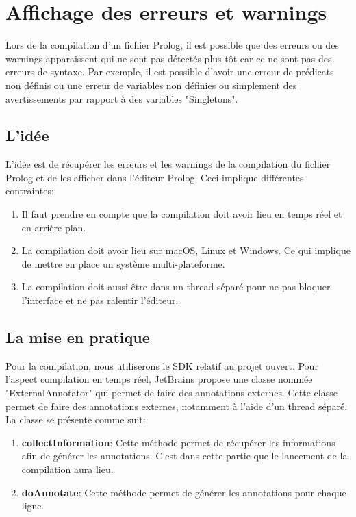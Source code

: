 \section{Affichage des erreurs et warnings}
\noindent Lors de la compilation d'un fichier Prolog, il est possible que des erreurs ou des warnings apparaissent
qui ne sont pas détectés plus tôt car ce ne sont pas des erreurs de syntaxe.
\newdoubleline
Par exemple, il est possible d'avoir une erreur de prédicats non définis ou une erreur de variables non définies ou simplement des avertissements par rapport à des variables "Singletons".

\subsection{L'idée}
\noindent L'idée est de récupérer les erreurs et les warnings de la compilation du fichier Prolog et de les afficher dans l'éditeur Prolog.
\newdoubleline
Ceci implique différentes contraintes:
\begin{enumerate}
    \item Il faut prendre en compte que la compilation doit avoir lieu en temps réel et en arrière-plan.
    \item La compilation doit avoir lieu sur macOS, Linux et Windows.
    Ce qui implique de mettre en place un système multi-plateforme.
    \item La compilation doit aussi être dans un thread séparé pour ne pas bloquer l'interface et ne pas ralentir l'éditeur.
\end{enumerate}

\subsection{La mise en pratique}
\noindent Pour la compilation, nous utiliserons le SDK relatif au projet ouvert.
\newdoubleline
Pour l'aspect compilation en temps réel, JetBrains propose une classe nommée "ExternalAnnotator" qui permet de faire des annotations externes.
\newdoubleline
Cette classe permet de faire des annotations externes, notamment à l'aide d'un thread séparé. La classe se présente comme suit:
\begin{enumerate}
    \item \textbf{collectInformation}: Cette méthode permet de récupérer les informations afin de générer les annotations.
    C'est dans cette partie que le lancement de la compilation aura lieu.
    \item \textbf{doAnnotate}: Cette méthode permet de générer les annotations pour chaque ligne.
\end{enumerate}

